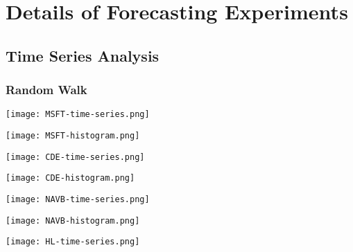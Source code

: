 \chapter{Details of Forecasting Experiments}

\section{Time Series Analysis}

\subsection{Random Walk}

\begin{center}
    \texttt{[image: MSFT-time-series.png]}
    \label{fig:nonfloat}
\end{center}

\begin{center}
    \texttt{[image: MSFT-histogram.png]}
    \label{fig:nonfloat}
\end{center}

\begin{center}  
    \texttt{[image: CDE-time-series.png]}
    \label{fig:nonfloat}
\end{center}

\begin{center}  
    \texttt{[image: CDE-histogram.png]}
    \label{fig:nonfloat}
\end{center}

\begin{center}
    \texttt{[image: NAVB-time-series.png]}
    \label{fig:nonfloat}
\end{center}

\begin{center}
    \texttt{[image: NAVB-histogram.png]}
    \label{fig:nonfloat}
\end{center}

\begin{center}
    \texttt{[image: HL-time-series.png]}
    \label{fig:nonfloat}
\end{center}

